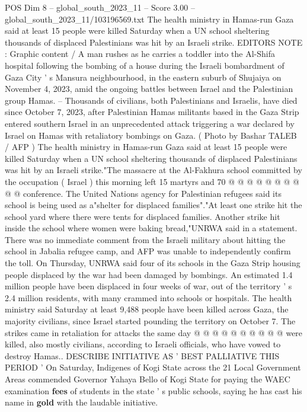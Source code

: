 \begin{textsample}{POS Dim 8 – global\_south\_2023\_11 – Score 3.00 – global\_south\_2023\_11/103196569.txt}  \label{ex:f8_pos_368}
The health ministry in Hamas-run Gaza said at least 15 people were killed Saturday when a UN school sheltering thousands of displaced Palestinians was hit by an Israeli strike.
EDITORS NOTE : Graphic content / A man rushes as he carries a toddler into the Al-Shifa hospital following the bombing of a house during the Israeli bombardment of Gaza City ' s Mansura neighbourhood, in the eastern suburb of Shujaiya on November 4, 2023, amid the ongoing battles between Israel and the Palestinian group Hamas. -- Thousands of civilians, both Palestinians and Israelis, have died since October 7, 2023, after Palestinian Hamas militants based in the Gaza Strip entered southern Israel in an unprecedented attack triggering a war declared by Israel on Hamas with retaliatory bombings on Gaza. ( Photo by Bashar TALEB / AFP ) The health ministry in Hamas-run Gaza said at least 15 people were killed Saturday when a UN school sheltering thousands of displaced Palestinians was hit by an Israeli strike."The massacre at the Al-Fakhura school committed by the occupation ( Israel ) this morning left 15 martyrs and 70 @ @ @ @ @ @ @ @ @ @ conference.
The United Nations agency for Palestinian refugees said its school is being used as a"shelter for displaced families"."At least one strike hit the school yard where there were tents for displaced families.
Another strike hit inside the school where women were baking bread,"UNRWA said in a statement.
There was no immediate comment from the Israeli military about hitting the school in Jabalia refugee camp, and AFP was unable to independently confirm the toll.
On Thursday, UNRWA said four of its schools in the Gaza Strip housing people displaced by the war had been damaged by bombings.
An estimated 1.4 million people have been displaced in four weeks of war, out of the territory ' s 2.4 million residents, with many crammed into schools or hospitals.
The health ministry said Saturday at least 9,488 people have been killed across Gaza, the majority civilians, since Israel started pounding the territory on October 7.
The strikes came in retaliation for attacks the same day @ @ @ @ @ @ @ @ @ @ were killed, also mostly civilians, according to Israeli officials, who have vowed to destroy Hamas..
DESCRIBE INITIATIVE AS ' BEST PALLIATIVE THIS PERIOD ' On Saturday, Indigenes of Kogi State across the 21 Local Government Areas commended Governor Yahaya Bello of Kogi State for paying the WAEC examination \textbf{fees} of students in the state ' s public schools, saying he has cast his name in \textbf{gold} with the laudable initiative.

\end{textsample}
